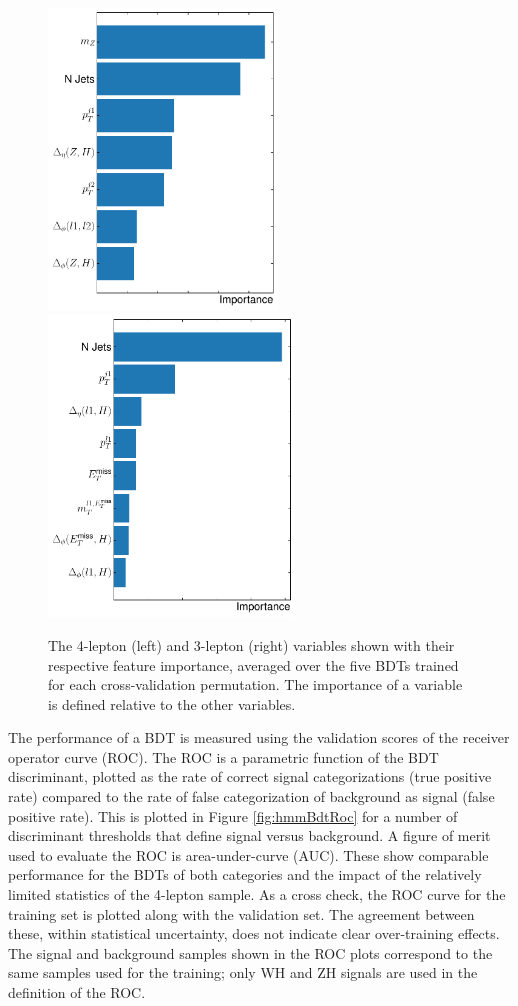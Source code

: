 \begin{figure}[htpb]
  \centering
  \includegraphics[height=8cm]{figures/hmm/bdtImportance/imp-4lep.pdf}
  \includegraphics[height=8cm]{figures/hmm/bdtImportance/imp-3lep.pdf}
  \caption{The 4-lepton (left) and 3-lepton (right) variables shown with their respective feature importance, averaged over the five BDTs trained for each cross-validation permutation. The importance of a variable is defined relative to the other variables.}
    \label{fig:hmmVarImport}
\end{figure}

The performance of a BDT is measured using the validation scores of the receiver operator curve (ROC).
The ROC is a parametric function of the BDT discriminant, plotted as the rate of correct signal categorizations (true positive rate) compared to the rate of false categorization of background as signal (false positive rate).
This is plotted in Figure \ref{fig:hmmBdtRoc} for a number of discriminant thresholds that define signal versus background.
A figure of merit used to evaluate the ROC is area-under-curve (AUC).
These show comparable performance for the BDTs of both categories and the impact of the relatively limited statistics of the 4-lepton sample.
As a cross check, the ROC curve for the training set is plotted along with the validation set. The agreement between these, within statistical uncertainty, does not indicate clear over-training effects.
The signal and background samples shown in the ROC plots correspond to the same samples used for the training; only WH and ZH signals are used in the definition of the ROC.

